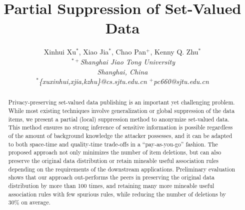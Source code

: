 \documentclass[conference,letterpaper]{sig-alternate}
\begin{document}
\title{Partial Suppression of Set-Valued Data}
\author{
{Xinhui Xu{\small $^{*}$}, Xiao Jia{\small $^{*}$},
Chao Pan{\small $^{+}$}, Kenny Q. Zhu{\small $^{*}$}}%
\vspace{1.6mm}\\
\fontsize{10}{10}\selectfont\itshape
$~^{*+}$Shanghai Jiao Tong University\\
\fontsize{10}{10}\selectfont\itshape
Shanghai, China\\
\fontsize{9}{9}\selectfont\ttfamily\upshape
$^*$\{xuxinhui,xjia,kzhu\}@cs.sjtu.edu.cn \hspace{5mm} $^+$pc660@sjtu.edu.cn
}
 \maketitle

\begin{abstract}
Privacy-preserving set-valued data publishing is an important yet challenging
problem. While most existing techniques involve generalization or global
suppression of the data items, we present a partial (local) suppression
method to anonymize set-valued data. This method ensures no strong
inference of sensitive information is possible regardless of
the amount of background knowledge the attacker possesses, and it
can be adapted to both space-time and quality-time trade-offs
in a ``pay-as-you-go'' fashion.
%
The proposed approach not only minimizes the number of item deletions,
but can also preserve the original data distribution or
retain mineable useful association rules depending on the requirements of
the downstream applications.
%
Preliminary evaluation shows that our approach out-performs
the peers in preserving the original data distribution by more than
100 times, and retaining many more mineable useful association rules
with few spurious rules, while reducing the number of deletions by
30\% on average.
\end{abstract}









%


{\renewcommand{\baselinestretch}{0.95}
\normalsize


}
\end{document}
